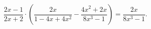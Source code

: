 \begin{ex}[type=equation]
	\begin{condition}
		$\dfrac{2x - 1}{2x + 2}\cdot\left(\dfrac{2x}{1 - 4x + 4x^2 } - \dfrac{4x^2 + 2x}{8x^3 - 1}\right) = \dfrac{2x}{8x^3 - 1}.$
	\end{condition}
\end{ex}